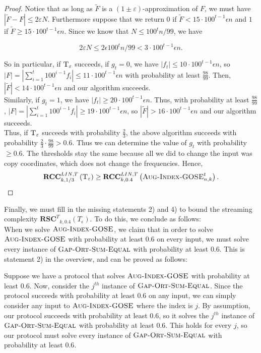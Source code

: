 \documentclass{toc}
\newcommand{\gap}{\ensuremath{\varepsilon}}
\newcommand{\rscT}{\ensuremath{\mathbf{RSC}^T}}
\newcommand{\rcclinT}{\ensuremath{\mathbf{RCC}^{LIN,T}}}
\newcommand{\hest}{ \textsc{T} }
\newcommand{\gose}{\textsc{Gap-Ort-Sum-Equal}}
\newcommand{\auggo}{\textsc{Aug-Index-GOSE}}
\begin{document}
\begin{proof}
	Notice that as long as $\widetilde{F}$ is a $(1\pm \gap)$-approximation of $F$, we must have $\left| \widetilde{F} -  F \right| \le 2\gap N$. Furthermore suppose that we return $0$ if $\widetilde{F} < 15 \cdot 100^{t-1}\epsilon n$ and $1$ if $\widetilde{F} \ge 15 \cdot 100^{t-1}\epsilon n$. Since we know that $N \le 100^{t}n/99$, we have
	
	$$2 \gap N \le 2 \epsilon 100^{t}n/99 < 3 \cdot 100^{t-1} \epsilon n.$$
	
	So in particular, if $\hest_\gap$ succeeds, if $g_t = 0$, we have $|f_t| \le 10 \cdot 100^{t-1}\epsilon n$, so $|F| = |\sum_{i=1}^{t}100^{i-1}f_i| \le 11 \cdot 100^{t-1} \epsilon n$ with probability at least $\frac{98}{99}$. Then, $|\tilde{F}| < 14 \cdot 100^{t-1} \epsilon n$ and our algorithm succeeds.\\
	
	Similarly, if $g_t = 1$, we have $|f_t| \ge 20 \cdot 100^{t-1} \epsilon n$. Thus, with probability at least $\frac{98}{99}$, $|F| = |\sum_{i=1}^{t}100^{i-1}f_i| \ge 19 \cdot 100^{t-1} \epsilon n$, so $|\tilde{F}| > 16 \cdot 100^{t-1} \epsilon n$ and our algorithm succeeds.\\
	
	Thus, if $\hest_\gap$ succeeds with probability $\frac{2}{3}$, the above algorithm succeeds with probability $\frac{2}{3} \cdot \frac{98}{99} > 0.6$. Thus we can determine the value of $g_t$ with probability $\ge 0.6$. The thresholds stay the same because all we did to change the input was copy coordinates, which does not change the frequencies. Hence,
	\begin{align}\notag
		\rcclinT_{k,1/3}\left(\hest_\gap \right) 
		\ge \rcclinT_{k,0.4}\left( \auggo_{n,k}^{t} \right).
	\end{align}
\end{proof}	

{\color{black} Finally, we must fill in the missing statements 2) and 4)} to bound the streaming complexity $\rscT_{k,0.4}( T_\epsilon)$. To do this, we conclude as follows:\\
	
	When we solve $\auggo$, we claim that in order to solve $\auggo$ with probability at least $0.6$ on every input, we must solve every instance of $\gose$ with probability at least $0.6$. {\color{black} This is statement 2) in the overview, and can be proved as follows:}
	
	{\color{black}Suppose we have a protocol that solves $\auggo$ with probability at least $0.6$. Now, consider the $j^{th}$ instance of $\gose$. Since the protocol succeeds with probability at least $0.6$ on any input, we can simply consider any input to $\auggo$ where the index is $j$. By assumption, our protocol succeeds with probability at least $0.6$, so it solves the $j^{th}$ instance of $\gose$ with probability at least $0.6$. This holds for every $j$, so our protocol must solve every instance of $\gose$ with probability at least $0.6$.}
	
\end{document}
